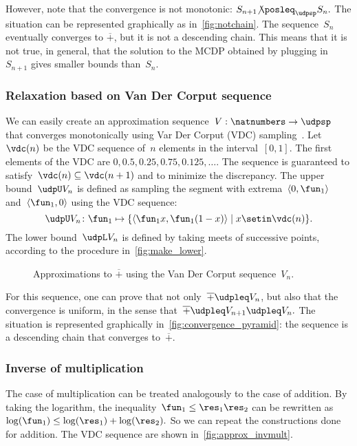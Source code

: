 However, note that the convergence is not monotonic: $S_{n+1}{\not\posleq}_{\udpsp}S_{n}.
$
The situation can be represented graphically as in~\cref{fig:notchain}.
The sequence~$S_{n}$ eventually converges to $\overline{+}$, but
it is not a descending chain.
This means that it is not true, in general,
that the solution to the MCDP obtained by plugging in~$S_{n+1}$
gives smaller bounds than~$S_{n}$.

\subsubsection*{Relaxation based on Van Der Corput sequence}

We can easily create an approximation sequence~$V:\natnumbers\to\udpsp$
that converges monotonically using Var Der Corput (VDC) sampling~\cite[Section 5.2]{LaValle2006Planning}.
Let~$\vdc(n)$ be the VDC sequence of~$n$ elements in the interval~$[0,1]$.
The first elements of the VDC are $0,0.5,0.25,0.75,0.125,\dots$.
The sequence is guaranteed to satisfy~$\vdc(n)\subseteq\vdc(n+1)$
and to minimize the discrepancy.
The upper bound~$\udpU V_{n}$
is defined as sampling the segment with extrema~$\left\langle 0,\fun_{1}\right\rangle $
and~$\left\langle \fun_{1},0\right\rangle $ using the VDC sequence:
\[
    \udpU V_{n}\colon\fun_{1}\mapsto\{\left\langle \fun_{1}x,\fun_{1}(1-x)\right\rangle \mid x\setin\vdc(n)\}.
\]
The lower bound~$\udpL V_{n}$ is defined by taking meets of successive
points, according to the procedure in~\cref{fig:make_lower}.

\begin{figure}[h]
    \centering
    \caption{Approximations to $\overline{+}$ using the Van Der
        Corput sequence~$V_{n}$.}
    \label{fig:Vn}
\end{figure}

For this sequence, one can prove that not only~$\overline{+}\udpleq V_{n}$,
but also that the convergence is uniform, in the sense that~$\overline{+}\udpleq V_{n+1}\udpleq V_{n}.
$
The situation is represented graphically in~\cref{fig:convergence_pyramid}:
the sequence is a descending chain that converges to~$\overline{+}$.

\subsubsection{Inverse of multiplication}

The case of multiplication can be treated analogously to the case
of addition.
By taking the logarithm, the inequality~$\fun_{1}\leq\res_{1}\res_{2}$
can be rewritten as~$\log(\fun_{1})\leq\log(\res_{1})+\log(\res_{2}).
$
So we can repeat the constructions done for addition.
The VDC sequence
are shown in~\cref{fig:approx_invmult}.


